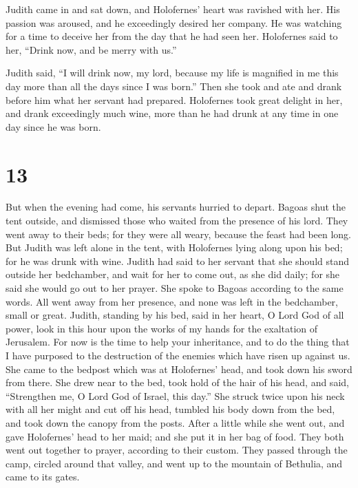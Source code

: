  Judith came in and sat down, and Holofernes' heart was
ravished with her. His passion was aroused, and he exceedingly desired
her company. He was watching for a time to deceive her from the day that
he had seen her.  Holofernes said to her, ``Drink now,
and be merry with us.''

 Judith said, ``I will drink now, my lord, because my
life is magnified in me this day more than all the days since I was
born.''  Then she took and ate and drank before him what
her servant had prepared.  Holofernes took great delight
in her, and drank exceedingly much wine, more than he had drunk at any
time in one day since he was born.

\hypertarget{section-12}{%
\section{13}\label{section-12}}

 But when the evening had come, his servants hurried to
depart. Bagoas shut the tent outside, and dismissed those who waited
from the presence of his lord. They went away to their beds; for they
were all weary, because the feast had been long.  But
Judith was left alone in the tent, with Holofernes lying along upon his
bed; for he was drunk with wine.  Judith had said to her
servant that she should stand outside her bedchamber, and wait for her
to come out, as she did daily; for she said she would go out to her
prayer. She spoke to Bagoas according to the same words. 
All went away from her presence, and none was left in the bedchamber,
small or great. Judith, standing by his bed, said in her heart, O Lord
God of all power, look in this hour upon the works of my hands for the
exaltation of Jerusalem.  For now is the time to help your
inheritance, and to do the thing that I have purposed to the destruction
of the enemies which have risen up against us.  She came
to the bedpost which was at Holofernes' head, and took down his sword
from there.  She drew near to the bed, took hold of the
hair of his head, and said, ``Strengthen me, O Lord God of Israel, this
day.''  She struck twice upon his neck with all her might
and cut off his head,  tumbled his body down from the bed,
and took down the canopy from the posts. After a little while she went
out, and gave Holofernes' head to her maid;  and she put
it in her bag of food. They both went out together to prayer, according
to their custom. They passed through the camp, circled around that
valley, and went up to the mountain of Bethulia, and came to its gates.

